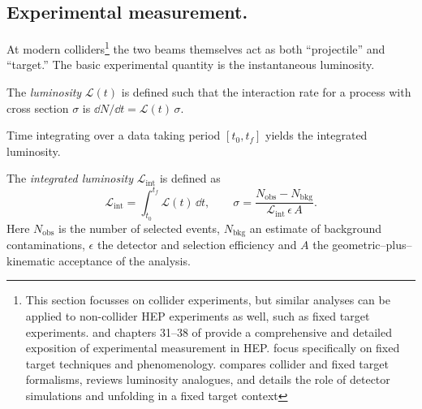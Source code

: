     \subsection{Experimental measurement.}
    \label{subsec:exp_measurement}
        At modern colliders\footnote{
            This section focusses on collider experiments, but similar analyses can be applied to non-collider HEP experiments as well, such as fixed target experiments.
            \cite{leo_techniques_1994} and chapters \numrange{31}{38} of \cite{particle_data_group_review_2022} provide a comprehensive and detailed exposition of experimental measurement in HEP.
            \cite{Brodsky2013PhysicsBeams, AveryCrossRates} focus specifically on fixed target techniques and phenomenology.
            \cite{MuheimNuclearLaws} compares collider and fixed target formalisms, reviews luminosity analogues, and details the role of detector simulations and unfolding in a fixed target context
        } the two beams themselves act as both ``projectile'' and ``target.'' 
        The basic experimental quantity is the instantaneous luminosity.
        \begin{definition}[Luminosity]
            The \emph{luminosity} \(\mathcal{L}(t)\) is defined such that the interaction rate for a process with cross section \(\sigma\) is \(\dd N/\dd t = \mathcal{L}(t)\,\sigma\).
        \end{definition}

        Time integrating over a data taking period \([t_0, t_f]\) yields the integrated luminosity.
        \begin{definition}
            The \emph{integrated luminosity} \(\mathcal{L}_{\text{int}}\) is defined as
            \begin{equation}
                \mathcal{L}_{\text{int}}
                = \int_{t_0}^{t_f} \mathcal{L}(t)\,\dd t,
                \qquad
                \sigma
                = \frac{N_{\text{obs}} - N_{\text{bkg}}}
                       {\mathcal{L}_{\text{int}}\,\epsilon\,A}.
                \label{eq:crossec_collider}
              \end{equation}
              Here \(N_{\text{obs}}\) is the number of selected events, \(N_{\text{bkg}}\) an estimate of background contaminations, \(\epsilon\) the detector and selection efficiency and \(A\) the geometric--plus--kinematic acceptance of the analysis.
        \end{definition}


